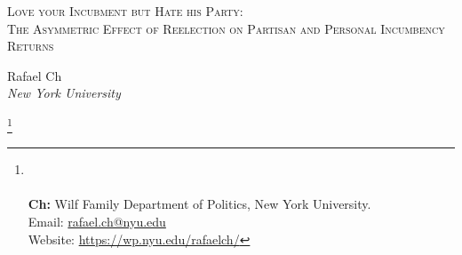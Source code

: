 \documentclass[12pt]{amsart}
\title{}
\numberwithin{equation}{section}
\theoremstyle{definition}
\theoremstyle{definition}
\theoremstyle{definition}
\begin{document}
	\vspace*{3ex minus 1ex}
	\begin{center}
		\Large \textsc{Love your Incubment but Hate his Party: \\ The Asymmetric Effect of Reelection on Partisan and Personal Incumbency Returns}
	\end{center}
	
	
\date{May 13, 2021} 
\vspace*{3ex minus 1ex}
	\begin{center}
		Rafael Ch\\
		
		\textit{New York University}\\
		
	\end{center}
	 
	\thanks{%
	\\
	 \\ \textbf{Ch:} Wilf Family Department of Politics, New York University. \\ Email: \url{rafael.ch@nyu.edu}
	 \\ Website: \url{https://wp.nyu.edu/rafaelch/}}
		  
\end{document}
